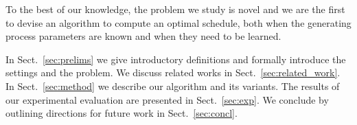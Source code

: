 To the best of our knowledge, the problem we study is novel and we are the first
to devise an algorithm to compute an optimal schedule, both when the generating
process parameters are known and when they need to be learned. 

 In Sect.~\ref{sec:prelims} we give introductory
definitions and formally introduce the settings and the problem. We discuss
related works in Sect.~\ref{sec:related_work}. In Sect.~\ref{sec:method} we
describe our algorithm \algoname and its variants. The results of our
experimental evaluation are presented in Sect.~\ref{sec:exp}. We conclude by
outlining directions for future work in Sect.~\ref{sec:concl}.
